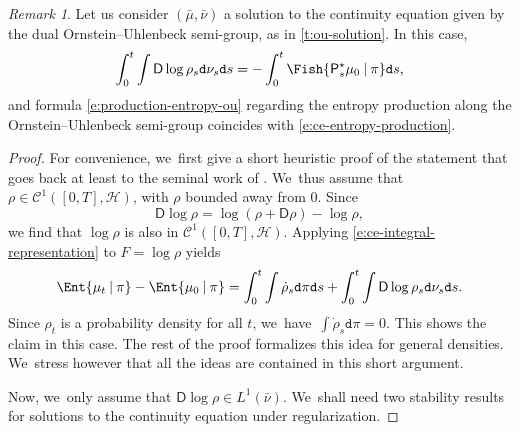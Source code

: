 \documentclass[JEP,XML,SOM,Unicode,published]{cedram}
\theoremstyle{definition}
\theoremstyle{remark}
\newtheorem{remark}[theorem]{Remark}
\newcommand{\given}[1][]{%
\nonscript\:#1\vert
\allowbreak
\nonscript\:
\mathopen{}}
\begin{document}
\begin{remark}\label{r:EntropyProdAlongOU}
Let us consider $(\bar{\mu}, \bar{\nu})$ a solution to the continuity equation given by the dual Ornstein--Uhlenbeck semi-group, as in \cref{t:ou-solution}.
In this case,
\begin{equation*}
\int_{0}^{t} \int \mathsf{D} \log \rho_{s} \mathtt{d} \nu_{s} \mathtt{d} s = - \int_{0}^{t} \Fish{ \mathsf{P}^{\star}_{s} \mu_{0} \given \pi } \mathtt{d} s,
\end{equation*}
and formula \cref{e:production-entropy-ou} regarding the entropy production along the Ornstein--Uhlenbeck semi-group coincides with \cref{e:ce-entropy-production}.
\end{remark}

\begin{proof}
For convenience, we~first give a short heuristic proof of the statement that goes back at least to the seminal work of \cite{OttoVillani}. We~thus assume that $\rho \in \mathscr{C}^{1}([0,T], \mathscr{H})$, with $\rho$ bounded away from $0$.
Since
\begin{equation*}
\mathsf{D} \log \rho = \log (\rho + \mathsf{D} \rho) - \log \rho,
\end{equation*}
we find that $\log \rho$ is also in $\mathscr{C}^{1}([0,T], \mathscr{H})$.
Applying \cref{e:ce-integral-representation} to $F = \log \rho$ yields
\begin{equation*}
\Ent{ \mu_{t} \given \pi } - \Ent{ \mu_{0} \given \pi } = \int_{0}^{t} \int \dot{\rho}_{s} \mathtt{d} \pi \mathtt{d} s + \int_{0}^{t} \int \mathsf{D} \log \rho_{s} \mathtt{d} \nu_{s} \mathtt{d} s.
\end{equation*}
Since $\rho_{t}$ is a probability density for all $t$, we~have~$\int \dot{\rho}_{s} \mathtt{d} \pi = 0$.
This shows the claim in this case.
The rest of the proof formalizes this idea for general densities. We~stress however that all the ideas are contained in this short argument.

Now, we~only assume that $\mathsf{D} \log \rho \in L^{1}(\bar{\nu})$. We~shall need two stability results for solutions to the continuity equation under regularization.

\end{proof}
\end{document}
